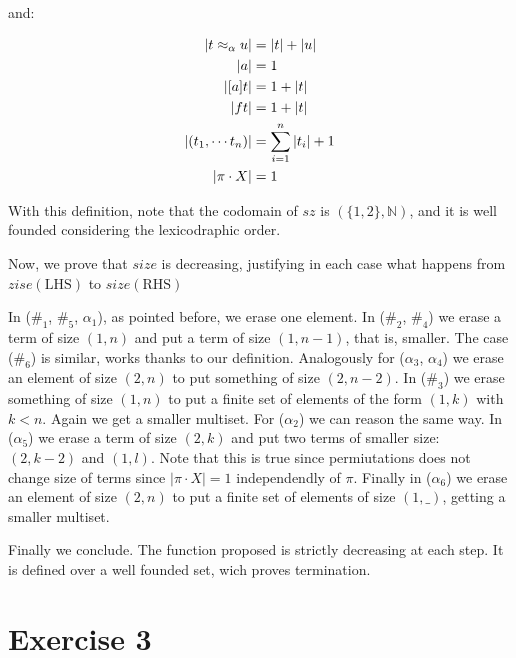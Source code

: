 \documentclass{article}
\newcommand\eqa[2]{
  \relax
  \ifmmode
      {#1 \approx_{\alpha} #2}
  \else
      $#1 \approx_{\alpha} #2$
  \fi}
\newcommand\mathize[1]{
  \relax
  \ifmmode
      {#1}
  \else
      {$#1$}
  \fi}
\newcommand\abs[2]{\mathize{[#1] #2}}
\newcommand\LHS{\textrm{LHS}}
\newcommand\RHS{\textrm{RHS}}
\newcommand{\simpl}[1]
                      {\left|#1\right|}
\begin{document}
and:

\begin{align*}
  \simpl{\eqa{t}{u}} &= \simpl{t} + \simpl{u}\\
  \simpl{a}      &= 1\\
  \simpl{\abs{a}{t}} &= 1 + \simpl{t}\\
  \simpl{f t} &= 1 + \simpl{t}\\
  \simpl{(t_1, \cdots t_n)} &= \sum_{i=1}^{n} \simpl{t_i} + 1\\
  \simpl{\pi \cdot X} &= 1
\end{align*}

With this definition, note that the codomain of $sz$ is $(\{1,2\},
\mathbb{N})$, and it is well founded considering the lexicodraphic
order.

Now, we prove that $size$ is decreasing, justifying in each case what
happens from $zise(\LHS)$ to $size(\RHS)$

In ($\#_1$, $\#_5$, $\alpha_1$), as pointed before, we erase one
element. In ($\#_2$, $\#_4$) we erase a term of size $(1,n)$ and put a
term of size $(1,n-1)$, that is, smaller. The case ($\#_6$) is
similar, works thanks to our definition. Analogously for ($\alpha_3$,
$\alpha_4$) we erase an element of size $(2,n)$ to put something of
size $(2,n-2)$.  In ($\#_3$) we erase something of size $(1,n)$ to put
a finite set of elements of the form $(1,k)$ with $k<n$. Again we get
a smaller multiset. For ($\alpha_2$) we can reason the same way.  In
($\alpha_5$) we erase a term of size $(2,k)$ and put two terms of
smaller size: $(2,k-2)$ and $(1,l)$. Note that this is true since
permiutations does not change size of terms since $\simpl{\pi \cdot X}
= 1$ independendly of $\pi$.  Finally in ($\alpha_6$) we erase an
element of size $(2,n)$ to put a finite set of elements of size
$(1,\_)$, getting a smaller multiset.


Finally we conclude. The function proposed is strictly decreasing at
each step. It is defined over a well founded set, wich proves
termination.


\newpage
\section*{Exercise 3}
\end{document}

